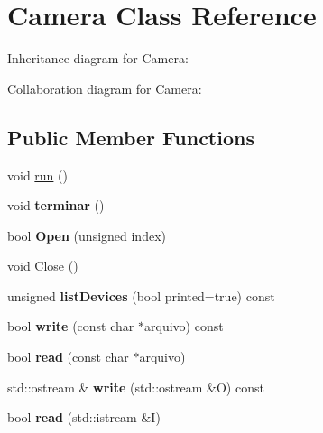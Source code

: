 \hypertarget{classCamera}{}\section{Camera Class Reference}
\label{classCamera}


Inheritance diagram for Camera\+:


Collaboration diagram for Camera\+:
\subsection*{Public Member Functions}
\begin{DoxyCompactItemize}
\item 
void \hyperlink{classCamera_aaa3745c0cf0f286ef80b7eeebc248cc9}{run} ()
\item 
void {\bfseries terminar} ()\hypertarget{classCamera_ac23da4af80b47b15ecff351730530000}{}\label{classCamera_ac23da4af80b47b15ecff351730530000}

\item 
bool {\bfseries Open} (unsigned index)\hypertarget{classCamera_a7d053aef332ee8193275b1f1831a7c56}{}\label{classCamera_a7d053aef332ee8193275b1f1831a7c56}

\item 
void \hyperlink{classCamera_ab5ed03b2c4bf168e678c845c4074a4f5}{Close} ()
\item 
unsigned {\bfseries list\+Devices} (bool printed=true) const \hypertarget{classCamera_a9e52bc20b53e35f82b1239b7a6db3cfa}{}\label{classCamera_a9e52bc20b53e35f82b1239b7a6db3cfa}

\item 
bool {\bfseries write} (const char $\ast$arquivo) const \hypertarget{classCamera_ab21eb843ec7960952cffd922ff88313c}{}\label{classCamera_ab21eb843ec7960952cffd922ff88313c}

\item 
bool {\bfseries read} (const char $\ast$arquivo)\hypertarget{classCamera_a4117156051ad9bd9592da324d28f9f3b}{}\label{classCamera_a4117156051ad9bd9592da324d28f9f3b}

\item 
std\+::ostream \& {\bfseries write} (std\+::ostream \&O) const \hypertarget{classCamera_a5b0db9336a585f5e4a0a32aaecbaaeda}{}\label{classCamera_a5b0db9336a585f5e4a0a32aaecbaaeda}

\item 
bool {\bfseries read} (std\+::istream \&I)\hypertarget{classCamera_ac768179644339146b3f7894d0d256d10}{}\label{classCamera_ac768179644339146b3f7894d0d256d10}


\end{DoxyCompactItemize}
